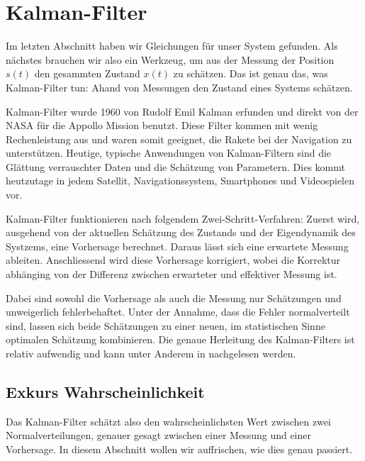 %
%
%
%
%



\section{Kalman-Filter}
Im letzten Abschnitt haben wir Gleichungen für unser System gefunden.
Als nächstes brauchen wir also ein Werkzeug,
um aus der Messung der Position $s(t)$ den gesammten Zustand $x(t)$ zu schätzen.
Das ist genau das, was Kalman-Filter tun: Ahand von Messungen den Zustand eines Systems schätzen.

Kalman-Filter wurde 1960 von Rudolf Emil Kalman erfunden und direkt von der NASA für die Appollo Mission benutzt.
Diese Filter kommen mit wenig Rechenleistung aus und waren somit geeignet, die Rakete bei der Navigation zu unterstützen. 
Heutige, typische Anwendungen von Kalman-Filtern sind die Glättung verrauschter Daten und die Schätzung von Parametern.
Dies kommt heutzutage in jedem Satellit, Navigationssystem, Smartphones und Videospielen vor.

Kalman-Filter funktionieren nach folgendem Zwei-Schritt-Verfahren:
Zuerst wird,
ausgehend von der aktuellen Schätzung des Zustands und der Eigendynamik des Systzems,
eine Vorhersage berechnet.
Daraus lässt sich eine erwartete Messung ableiten.
Anschliessend wird diese Vorhersage korrigiert,
wobei die Korrektur abhänging von der Differenz zwischen erwarteter und effektiver Messung ist.

Dabei sind sowohl die Vorhersage als auch die Messung nur Schätzungen und unweigerlich fehlerbehaftet.
Unter der Annahme, dass die Fehler normalverteilt sind,
lassen sich beide Schätzungen zu einer neuen, im statistischen Sinne optimalen Schätzung kombinieren.
Die genaue Herleitung des Kalman-Filters ist relativ aufwendig
und kann unter Anderem in \cite{erdbeben:skript:wrstat} nachgelesen werden.

\subsection{Exkurs Wahrscheinlichkeit} 
\label{erdbeben:Wahrscheindlichkeit} 
Das Kalman-Filter schätzt also den wahrscheinlichsten Wert zwischen zwei Normalverteilungen,
genauer gesagt zwischen einer Messung und einer Vorhersage.
In diesem Abschnitt wollen wir auffrischen, wie dies genau passiert.

